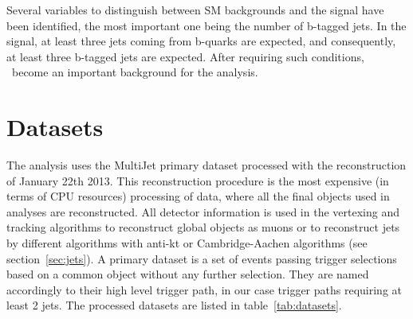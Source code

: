Several variables to distinguish between SM backgrounds and the signal have been identified, the most important one being the number of b-tagged jets. In the signal, at least three jets coming from b-quarks are expected, and consequently, at least three b-tagged jets are expected. After requiring such conditions, \ttbar~become an important background for the analysis. %

\section{Datasets}
\label{sec:data}

The analysis uses the MultiJet primary dataset processed with the reconstruction of January 22th 2013. This reconstruction procedure is the most expensive (in terms of CPU resources) processing of data, where all the final objects used in analyses are reconstructed. All detector information is used in the vertexing and tracking algorithms to reconstruct global objects as muons or to reconstruct jets by different algorithms with anti-kt or Cambridge-Aachen algorithms (see section~\ref{sec:jets}). A primary dataset is a set of events passing trigger selections based on a common object without any further selection. They are named accordingly to their high level trigger path, in our case trigger paths requiring at least 2 jets. The processed datasets are listed in table~\ref{tab:datasets}.

\begin{table*}[htbH]
\begin{center}
\caption{List of Multijet Primary Dataset used in the analysis and the corresponding integrated luminosity calculated using the golden JSON (Java Script Object Notation) file. The golden JSON file contains the information about the luminosity sections considered as good for all runs. A good luminosity section is defined as a luminosity section where the detector was fully functioning, that is all subsystems were taking data without any problems.  \label{tab:datasets}}
\end{center}
\end{table*}

